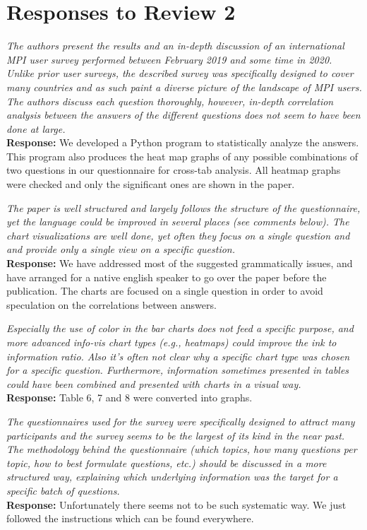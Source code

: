 \documentclass[11pt]{article}
\newcommand{\response}[2]{{\vspace{5mm}\noindent{\bf Comment:} \em #1}\\%
  {\bf Response:} #2}
\begin{document}
\section*{Responses to Review 2}

\response{The authors present the results and an in-depth discussion
  of an international MPI user survey performed between February 2019
  and some time in 2020. Unlike prior user surveys, the described
  survey was specifically designed to cover many countries and as such
  paint a diverse picture of the landscape of MPI users. The authors
  discuss each question thoroughly, however, in-depth correlation
  analysis between the answers of the different questions does not
  seem to have been done at large.}
 {
We developed a Python program to statistically analyze the answers. This program also
produces the heat map graphs of any possible combinations of two
questions in our questionnaire for cross-tab analysis. All heatmap
graphs were checked and only the significant ones are shown in the
paper.
 }


\response{The paper is well structured and largely follows the
  structure of the questionnaire, yet the language could be improved
  in several places (see comments below). The chart visualizations are
  well done, yet often they focus on a single question and and provide
  only a single view on a specific question.}
{
 We have addressed most of the suggested grammatically issues, and have
 arranged for a native english speaker to go over the paper before the
 publication.  The charts are focused on a single question in order to
 avoid speculation on the correlations between answers.
}


\response{Especially the use of color in the bar charts does not feed
  a specific purpose, and more advanced info-vis chart types (e.g.,
  heatmaps) could improve the ink to information ratio.
  Also it's often not clear why a specific chart type was
  chosen for a specific question. Furthermore, information sometimes
  presented in tables could have been combined and presented with
  charts in a visual way.}
{Table 6, 7 and 8 were converted into graphs.}

\response{The questionnaires used for the survey were specifically
  designed to attract many participants and the survey seems to be the
  largest of its kind in the near past. The methodology behind the
  questionnaire (which topics, how many questions per topic, how to
  best formulate questions, etc.) should be discussed in a more
  structured way, explaining which underlying information was the
  target for a specific batch of questions.}
{
Unfortunately there seems not to be such systematic way. We just
followed the instructions which can be found everywhere.
}
\end{document}
